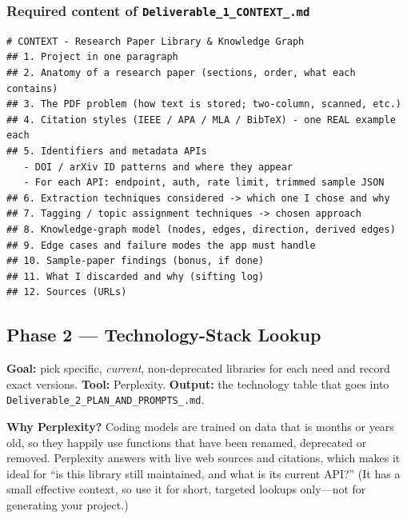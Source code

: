\documentclass[11pt,a4paper]{article}
\newcommand{\uid}{[HeUserID]}
\newcommand{\dA}{\texttt{Deliverable\_1\_\allowbreak CONTEXT\_\allowbreak\uid.md}}
\newcommand{\dB}{\texttt{Deliverable\_2\_\allowbreak PLAN\_AND\_PROMPTS\_\allowbreak\uid.md}}
\begin{document}
\subsubsection{Required content of \dA}
\begin{lstlisting}
# CONTEXT - Research Paper Library & Knowledge Graph
## 1. Project in one paragraph
## 2. Anatomy of a research paper (sections, order, what each contains)
## 3. The PDF problem (how text is stored; two-column, scanned, etc.)
## 4. Citation styles (IEEE / APA / MLA / BibTeX) - one REAL example each
## 5. Identifiers and metadata APIs
   - DOI / arXiv ID patterns and where they appear
   - For each API: endpoint, auth, rate limit, trimmed sample JSON
## 6. Extraction techniques considered -> which one I chose and why
## 7. Tagging / topic assignment techniques -> chosen approach
## 8. Knowledge-graph model (nodes, edges, direction, derived edges)
## 9. Edge cases and failure modes the app must handle
## 10. Sample-paper findings (bonus, if done)
## 11. What I discarded and why (sifting log)
## 12. Sources (URLs)
\end{lstlisting}

\subsection{Phase 2 --- Technology-Stack Lookup}
\label{sec:phase2}
\textbf{Goal:} pick specific, \emph{current}, non-deprecated libraries for each need and record exact versions. \textbf{Tool:} Perplexity. \textbf{Output:} the technology table that goes into \dB.

\textbf{Why Perplexity?} Coding models are trained on data that is months or years old, so they happily use functions that have been renamed, deprecated or removed. Perplexity answers with live web sources and citations, which makes it ideal for ``is this library still maintained, and what is its current API?'' (It has a small effective context, so use it for short, targeted lookups only---not for generating your project.)
\end{document}
